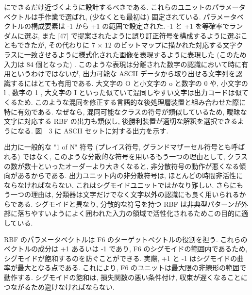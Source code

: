 \documentclass[twocolumn]{jarticle}     %
\begin{document}
にできるだけ近づくように設計するべきである.
これらのユニットのパラメータベクトルは手作業で選ばれ, (少なくとも最初は) 固定されている. パラメータベクトルの構成要素は -1 から +1 の範囲で設定された. -1 と +1 を等確率でランダムに選ぶ, また [47] で提案されたように誤り訂正符号を構成するように選ぶこともできたが, その代わりに 7 × 12 のビットマップに描かれた対応する文字クラスに一致させるように様式化された画像を表現するように表現した (このため入力は 84 個となった) . このような表現は分離された数字の認識において時に有用というわけではないが, 出力可能な ASCII データから取り出せる文字列を認識するにはとても有用である.
大文字の O と小文字の o と数字の 0 や, 小文字の l , 数字の 1 , 大文字の I といった似ていて混同しやすい文字は出力コードは似てくるため. このような混同を修正する言語的な後処理層装置と組み合わせた際に特に有効である. なぜなら, 混同可能なクラスの符号が類似しているため, 曖昧な文字に対応する RBF の出力も類似し, 後勝利装置が適切な解釈を選択できるようになる. 図　3 に ASCII セットに対する出力を示す.
\par
出力に一般的な "1 of N" 符号 (プレイス符号, グランドマザーセル符号とも呼ばれる) ではなく, このような分散的な符号を用いるもう一つの理由として, クラスの数が数十といったオーダーより大きくなると, 非分散符号の動作が悪くなる傾向があるからである.
出力ユニット内の非分散符号は, ほとんどの時間非活性にならなければならない. これはシグモイドユニットではかなり難しい. さらにもう一つの理由は, 分類器は文字だけでなく文字以外の認識にも良く用いられるからである. シグモイドと異なり, 分散的な符号を持つ RBF は非典型パターンが外部に落ちやすいようによく囲われた入力の領域で活性化されるためこの目的に適している.
\par
RBF のパラメータベクトルは F6 のターゲットベクトルの役割を担う. これらのベクトルの成分は +1 あるいは -1 であり, F6 のシグモイドの範囲内であるため, シグモイドが飽和するのを防ぐことができる. 実際, +1 と -1 はシグモイドの曲率が最大となる点である.
これにより, F6 のユニットは最大限の非線形の範囲で動作する.
シグモイドの飽和は, 損失関数の悪い条件付け, 収束が遅くなることにつながるため避けなければならない.
\end{document}
